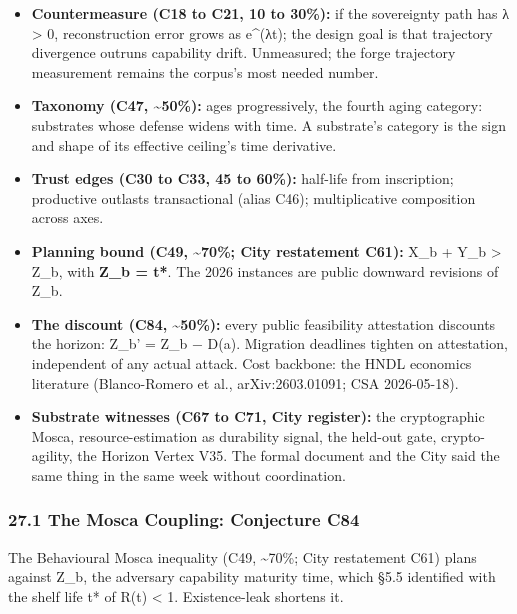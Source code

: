 \documentclass[
  11pt,
]{article}
\providecommand{\tightlist}{%
  \setlength{\itemsep}{0pt}\setlength{\parskip}{0pt}}
\begin{document}
\begin{itemize}
\tightlist
\item
  \textbf{Countermeasure (C18 to C21, 10 to 30\%):} if the sovereignty
  path has λ \textgreater{} 0, reconstruction error grows as e\^{}(λt);
  the design goal is that trajectory divergence outruns capability
  drift. Unmeasured; the forge trajectory measurement remains the
  corpus's most needed number.
\item
  \textbf{Taxonomy (C47, \textasciitilde50\%):} ages progressively, the
  fourth aging category: substrates whose defense widens with time. A
  substrate's category is the sign and shape of its effective ceiling's
  time derivative.
\item
  \textbf{Trust edges (C30 to C33, 45 to 60\%):} half-life from
  inscription; productive outlasts transactional (alias C46);
  multiplicative composition across axes.
\item
  \textbf{Planning bound (C49, \textasciitilde70\%; City restatement
  C61):} X\_b + Y\_b \textgreater{} Z\_b, with \textbf{Z\_b = t*}. The
  2026 instances are public downward revisions of Z\_b.
\item
  \textbf{The discount (C84, \textasciitilde50\%):} every public
  feasibility attestation discounts the horizon: Z\_b' = Z\_b − D(a).
  Migration deadlines tighten on attestation, independent of any actual
  attack. Cost backbone: the HNDL economics literature (Blanco-Romero et
  al., arXiv:2603.01091; CSA 2026-05-18).
\item
  \textbf{Substrate witnesses (C67 to C71, City register):} the
  cryptographic Mosca, resource-estimation as durability signal, the
  held-out gate, crypto-agility, the Horizon Vertex V35. The formal
  document and the City said the same thing in the same week without
  coordination.
\end{itemize}

\subsubsection{27.1 The Mosca Coupling: Conjecture
C84}\label{the-mosca-coupling-conjecture-c84}

The Behavioural Mosca inequality (C49, \textasciitilde70\%; City
restatement C61) plans against Z\_b, the adversary capability maturity
time, which §5.5 identified with the shelf life t* of R(t) \textless{}
1. Existence-leak shortens it.
\end{document}
